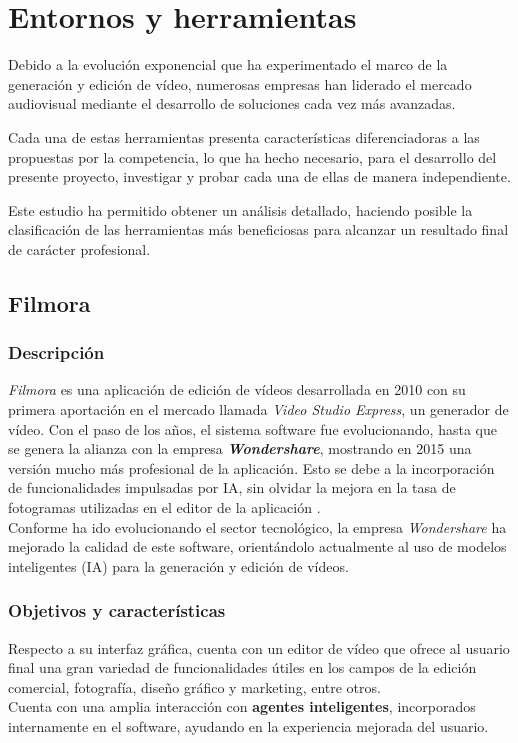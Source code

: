 \section{Entornos y herramientas}
Debido a la evolución exponencial que ha experimentado el marco de la generación y 
edición de vídeo, numerosas empresas han liderado el mercado audiovisual mediante el desarrollo 
de soluciones cada vez más avanzadas. 

Cada una de estas herramientas presenta características diferenciadoras a las propuestas por 
la competencia, lo que ha hecho necesario, para el desarrollo del presente 
proyecto, investigar y probar cada una de ellas de manera independiente. 

Este estudio ha permitido obtener un análisis detallado, haciendo posible la clasificación 
de las herramientas más beneficiosas para alcanzar un resultado final de carácter profesional.

\subsection{Filmora}
\subsubsection{Descripción}

\textit{Filmora} es una aplicación de edición de vídeos desarrollada en 2010 con su primera aportación 
en el mercado llamada \textit{Video Studio Express}, un generador de vídeo. Con el paso de los años, 
el sistema software fue evolucionando, hasta que se genera la alianza con la empresa 
\textbf{\textit{Wondershare}}, mostrando en 2015 una versión mucho más profesional de la aplicación. 
Esto se debe a la incorporación de funcionalidades impulsadas por IA, sin olvidar la 
mejora en la tasa de fotogramas utilizadas en el editor de la aplicación \cite{filmora-historia}.\\
Conforme ha ido evolucionando el sector tecnológico, la empresa \textit{Wondershare} 
ha mejorado la calidad de este software, orientándolo actualmente al uso de 
modelos inteligentes (IA) para la generación y edición de vídeos.

\subsubsection{Objetivos y características}

Respecto a su interfaz gráfica, cuenta con un editor de vídeo que ofrece al usuario 
final una gran variedad de funcionalidades útiles en los campos de la edición comercial, 
fotografía, diseño gráfico y marketing, entre otros.\\
Cuenta con una amplia interacción con \textbf{agentes inteligentes}, incorporados 
internamente en el software, ayudando en la experiencia mejorada del usuario. 

